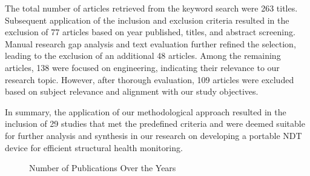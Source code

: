\documentclass[journal, a4paper]{IEEEtran}
\begin{document}
The total number of articles retrieved from the keyword search were 263 titles. Subsequent application of the inclusion and exclusion criteria resulted in the exclusion of 77 articles based on year published, titles, and abstract screening. Manual research gap analysis and text evaluation further refined the selection, leading to the exclusion of an additional 48 articles. Among the remaining articles, 138 were focused on engineering, indicating their relevance to our research topic. However, after thorough evaluation, 109 articles were excluded based on subject relevance and alignment with our study objectives.

In summary, the application of our  methodological approach resulted in the inclusion of 29 studies that met the predefined criteria and were deemed suitable for further analysis and synthesis in our research on developing a portable NDT device for efficient structural health monitoring.

\begin{figure}
  \centering
  \caption{Number of Publications Over the Years}
  \label{fig:publications}
\end{figure}

\lipsum[1]
\end{document}
